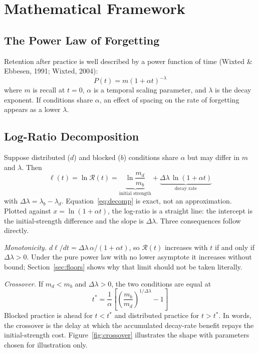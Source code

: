 \documentclass[10pt,twocolumn]{article}
\newcommand{\effr}{\mathcal{R}}
\newcommand{\lr}{\ell}
\begin{document}
\section{Mathematical Framework}

\subsection{The Power Law of Forgetting}

Retention after practice is well described by a power function of time (Wixted \& Ebbesen, 1991; Wixted, 2004):
\begin{equation}
P(t) = m(1 + \alpha t)^{-\lambda}
\label{eq:powerlaw}
\end{equation}
where $m$ is recall at $t = 0$, $\alpha$ is a temporal scaling parameter, and $\lambda$ is the decay exponent. If conditions share $\alpha$, an effect of spacing on the rate of forgetting appears as a lower $\lambda$.

\subsection{Log-Ratio Decomposition}

Suppose distributed ($d$) and blocked ($b$) conditions share $\alpha$ but may differ in $m$ and $\lambda$. Then
\begin{equation}
\lr(t) = \ln\effr(t) = \underbrace{\ln\frac{m_d}{m_b}}_{\text{initial strength}} + \underbrace{\Delta\lambda \, \ln(1 + \alpha t)}_{\text{decay rate}}
\label{eq:decomp}
\end{equation}
with $\Delta\lambda = \lambda_b - \lambda_d$. Equation~\ref{eq:decomp} is exact, not an approximation. Plotted against $x = \ln(1+\alpha t)$, the log-ratio is a straight line: the intercept is the initial-strength difference and the slope is $\Delta\lambda$. Three consequences follow directly.

\textit{Monotonicity.} $d\lr/dt = \Delta\lambda\,\alpha/(1+\alpha t)$, so $\effr(t)$ increases with $t$ if and only if $\Delta\lambda > 0$. Under the pure power law with no lower asymptote it increases without bound; Section~\ref{sec:floors} shows why that limit should not be taken literally.

\textit{Crossover.} If $m_d < m_b$ and $\Delta\lambda > 0$, the two conditions are equal at
\begin{equation}
t^* = \frac{1}{\alpha}\left[\left(\frac{m_b}{m_d}\right)^{1/\Delta\lambda} - 1\right]
\label{eq:crossover}
\end{equation}
Blocked practice is ahead for $t < t^*$ and distributed practice for $t > t^*$. In words, the crossover is the delay at which the accumulated decay-rate benefit repays the initial-strength cost. Figure~\ref{fig:crossover} illustrates the shape with parameters chosen for illustration only.
\end{document}
